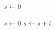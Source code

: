 \documentclass{article}
\begin{document}
\begin{algorithm}[h]
  \caption{Sum}
  $s \leftarrow 0$\;
\end{algorithm}
\begin{algorithmic}
  \STATE $s \gets 0$
    \STATE $s \gets s + i$
  \ENDFOR
\end{algorithmic}
\end{document}
